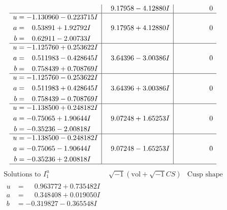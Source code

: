 \documentclass[1p]{elsarticle_modified}
\theoremstyle{definition}
\newcommand{\I}{\sqrt{-1}}
\begin{document}
$$\begin{array}{c|c|c}
 & \phantom{-}9.17958 - 4.12880 I & \phantom{-0.000000 } 0 \\ \hline\begin{aligned}
u &= -1.130960 - 0.223715 I \\
a &= \phantom{-}0.53891 + 1.92792 I \\
b &= \phantom{-}0.62911 - 2.00733 I\end{aligned}
 & \phantom{-}9.17958 + 4.12880 I & \phantom{-0.000000 } 0 \\ \hline\begin{aligned}
u &= -1.125760 + 0.253622 I \\
a &= \phantom{-}0.511983 - 0.428645 I \\
b &= \phantom{-}0.758439 + 0.708769 I\end{aligned}
 & \phantom{-}3.64396 - 3.00386 I & \phantom{-0.000000 } 0 \\ \hline\begin{aligned}
u &= -1.125760 - 0.253622 I \\
a &= \phantom{-}0.511983 + 0.428645 I \\
b &= \phantom{-}0.758439 - 0.708769 I\end{aligned}
 & \phantom{-}3.64396 + 3.00386 I & \phantom{-0.000000 } 0 \\ \hline\begin{aligned}
u &= -1.138500 + 0.248182 I \\
a &= -0.75065 + 1.90644 I \\
b &= -0.35236 - 2.00818 I\end{aligned}
 & \phantom{-}9.07248 + 1.65253 I & \phantom{-0.000000 } 0 \\ \hline\begin{aligned}
u &= -1.138500 - 0.248182 I \\
a &= -0.75065 - 1.90644 I \\
b &= -0.35236 + 2.00818 I\end{aligned}
 & \phantom{-}9.07248 - 1.65253 I & \phantom{-0.000000 } 0\\
 \hline 
 \end{array}$$\newpage$$\begin{array}{c|c|c}  
\text{Solutions to }I^u_{1}& \I (\text{vol} + \sqrt{-1}CS) & \text{Cusp shape}\\
 \hline 
\begin{aligned}
u &= \phantom{-}0.963772 + 0.735482 I \\
a &= \phantom{-}0.348408 + 0.019050 I \\
b &= -0.319827 - 0.365548 I\end{aligned}

\end{array}$$
\end{document}
